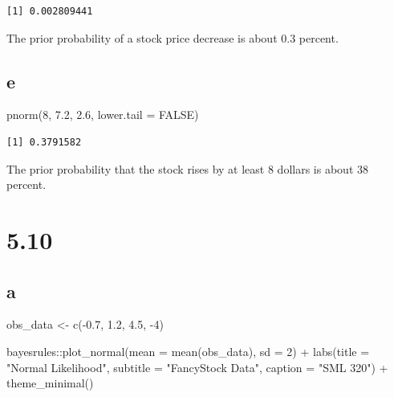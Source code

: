 \documentclass[
  letterpaper,
  DIV=11,
  numbers=noendperiod]{scrartcl}
\newenvironment{Shaded}{\begin{snugshade}}{\end{snugshade}}
\newcommand{\AttributeTok}[1]{\textcolor[rgb]{0.40,0.45,0.13}{#1}}
\newcommand{\ConstantTok}[1]{\textcolor[rgb]{0.56,0.35,0.01}{#1}}
\newcommand{\DecValTok}[1]{\textcolor[rgb]{0.68,0.00,0.00}{#1}}
\newcommand{\FloatTok}[1]{\textcolor[rgb]{0.68,0.00,0.00}{#1}}
\newcommand{\FunctionTok}[1]{\textcolor[rgb]{0.28,0.35,0.67}{#1}}
\newcommand{\NormalTok}[1]{\textcolor[rgb]{0.00,0.23,0.31}{#1}}
\newcommand{\OtherTok}[1]{\textcolor[rgb]{0.00,0.23,0.31}{#1}}
\newcommand{\SpecialCharTok}[1]{\textcolor[rgb]{0.37,0.37,0.37}{#1}}
\newcommand{\StringTok}[1]{\textcolor[rgb]{0.13,0.47,0.30}{#1}}
\begin{document}
\begin{verbatim}
[1] 0.002809441
\end{verbatim}

The prior probability of a stock price decrease is about 0.3 percent.

\hypertarget{e}{%
\subsection{e}\label{e}}

\begin{Shaded}
\begin{Highlighting}[]
\FunctionTok{pnorm}\NormalTok{(}\DecValTok{8}\NormalTok{, }\FloatTok{7.2}\NormalTok{, }\FloatTok{2.6}\NormalTok{, }\AttributeTok{lower.tail =} \ConstantTok{FALSE}\NormalTok{)}
\end{Highlighting}
\end{Shaded}

\begin{verbatim}
[1] 0.3791582
\end{verbatim}

The prior probability that the stock rises by at least 8 dollars is
about 38 percent.

\hypertarget{section-3}{%
\section{5.10}\label{section-3}}

\hypertarget{a-3}{%
\subsection{a}\label{a-3}}

\begin{Shaded}
\begin{Highlighting}[]
\NormalTok{obs\_data }\OtherTok{\textless{}{-}} \FunctionTok{c}\NormalTok{(}\SpecialCharTok{{-}}\FloatTok{0.7}\NormalTok{, }\FloatTok{1.2}\NormalTok{, }\FloatTok{4.5}\NormalTok{, }\SpecialCharTok{{-}}\DecValTok{4}\NormalTok{)}

\NormalTok{bayesrules}\SpecialCharTok{::}\FunctionTok{plot\_normal}\NormalTok{(}\AttributeTok{mean =} \FunctionTok{mean}\NormalTok{(obs\_data), }\AttributeTok{sd =} \DecValTok{2}\NormalTok{) }\SpecialCharTok{+}
  \FunctionTok{labs}\NormalTok{(}\AttributeTok{title =} \StringTok{"Normal Likelihood"}\NormalTok{,}
       \AttributeTok{subtitle =} \StringTok{"FancyStock Data"}\NormalTok{,}
       \AttributeTok{caption =} \StringTok{"SML 320"}\NormalTok{) }\SpecialCharTok{+}
  \FunctionTok{theme\_minimal}\NormalTok{()}
\end{Highlighting}
\end{Shaded}
\end{document}
